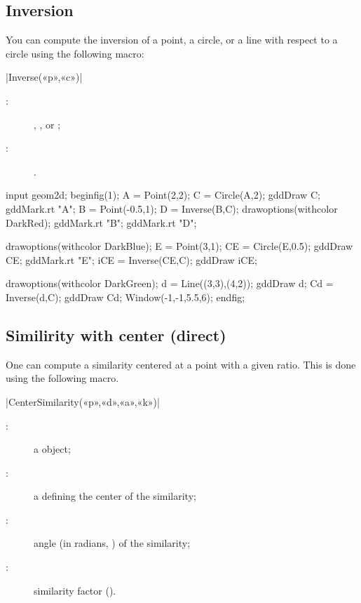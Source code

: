 \documentclass[a4paper,english]{article}
\begin{document}
\subsection{Inversion}

You can compute the inversion of a point, a circle, or a line with respect to a circle using the following macro:
\begin{colourband}
\macro|Inverse(«p»,«c»)|
\begin{description}
  \item[:]  , , or ;
  \item[:]  .
\end{description}
\end{colourband}
\bigskip

\begin{ExempleMP}
input geom2d;
beginfig(1);
  A = Point(2,2);
  C = Circle(A,2);
  gddDraw C;
  gddMark.rt "A";
  B = Point(-0.5,1);
  D = Inverse(B,C);
  drawoptions(withcolor DarkRed);
  gddMark.rt "B";  gddMark.rt "D";

  drawoptions(withcolor DarkBlue);
  E = Point(3,1);
  CE = Circle(E,0.5);
  gddDraw CE;
  gddMark.rt "E";
  iCE = Inverse(CE,C);
  gddDraw iCE;

  drawoptions(withcolor DarkGreen);
  d = Line((3,3),(4,2));
  gddDraw d;
  Cd = Inverse(d,C);
  gddDraw Cd;
  Window(-1,-1,5.5,6);
endfig;
\end{ExempleMP}

\subsection{Similirity with center (direct)}

One can compute a similarity centered at a point with a given ratio. This is done using the following macro.

\begin{colourband}
\macro|CenterSimilarity(«p»,«d»,«a»,«k»)|
\begin{description}
  \item[:] a \mpgeomdd{} object;
  \item[:] a  defining the center of the similarity;
  \item[:] angle (in radians, ) of the similarity;
  \item[:] similarity factor ().  
\end{description}
\end{colourband}
\end{document}
